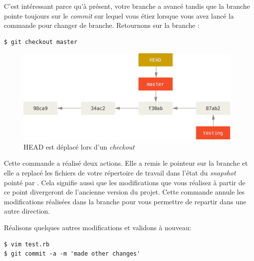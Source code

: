 C'est intéressant parce qu'à présent, votre branche  a avancé tandis que la branche  pointe toujours sur le \emph{commit} sur lequel vous étiez lorsque vous avez lancé la commande  pour changer de branche.
Retournons sur la branche :
\begin{Schunk}
\begin{Verbatim}
$ git checkout master
\end{Verbatim}
\end{Schunk}

\begin{figure}[H]
  \centering
  \includegraphics{images/checkout-master}
  \caption{HEAD est déplacé lors d'un \emph{checkout}}
  \label{fig:git:checkout-master}
\end{figure}

Cette commande a réalisé deux actions.
Elle a remis le pointeur  sur la branche  et elle a replacé les fichiers de votre répertoire de travail dans l'état du \emph{snapshot} pointé par .
Cela signifie aussi que les modifications que vous réalisez à partir de ce point divergeront de l'ancienne version du projet.
Cette commande annule les modifications réalisées dans la branche  pour vous permettre de repartir dans une autre direction.


Réalisons quelques autres modifications et validons à nouveau:
\begin{Schunk}
\begin{Verbatim}
$ vim test.rb
$ git commit -a -m 'made other changes'
\end{Verbatim}
\end{Schunk}

